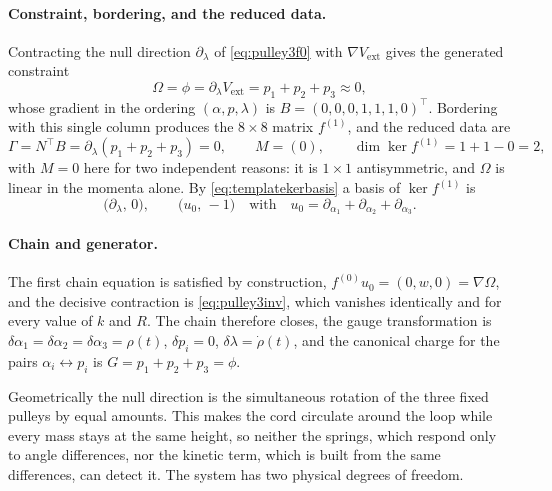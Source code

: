 \documentclass[12pt]{article}
\theoremstyle{plain}
\theoremstyle{definition}
\theoremstyle{remark}
\newcommand{\Om}{\Omega}
\begin{document}
	\paragraph{Constraint, bordering, and the reduced data.} Contracting the null
	direction $\partial_{\lambda}$ of \eqref{eq:pulley3f0} with
	$\nabla V_{\mathrm{ext}}$ gives the generated constraint
	\begin{equation}
		\Om=\phi=\partial_{\lambda}V_{\mathrm{ext}}=p_{1}+p_{2}+p_{3}\approx0,
		\label{eq:pulley3phi}
	\end{equation}
	whose gradient in the ordering $(\alpha,p,\lambda)$ is
	$B=(0,0,0,1,1,1,0)^{\top}$. Bordering with this single column produces the
	$8\times8$ matrix $f^{(1)}$, and the reduced data are
	\begin{equation}
		\Gamma=N^{\top}B=\partial_{\lambda}(p_{1}+p_{2}+p_{3})=0,
		\qquad
		M=(0),
		\qquad
		\dim\ker f^{(1)}=1+1-0=2,
		\label{eq:pulley3GM}
	\end{equation}
	with $M=0$ here for two independent reasons: it is $1\times1$ antisymmetric,
	and $\Om$ is linear in the momenta alone. By
	\eqref{eq:templatekerbasis} a basis of $\ker f^{(1)}$ is
	\begin{equation}
		\bigl(\partial_{\lambda},\,0\bigr),
		\qquad
		\bigl(u_{0},\,-1\bigr)
		\quad\text{with}\quad
		u_{0}=\partial_{\alpha_{1}}+\partial_{\alpha_{2}}+\partial_{\alpha_{3}} .
		\label{eq:pulley3ker1}
	\end{equation}
	
	\paragraph{Chain and generator.} The first chain equation is satisfied by
	construction, $f^{(0)}u_{0}=(0,w,0)=\nabla\Om$, and the decisive contraction is
	\eqref{eq:pulley3inv}, which vanishes identically and for every value of
	$k$ and $R$. The chain therefore closes, the gauge transformation is
	$\delta\alpha_{1}=\delta\alpha_{2}=\delta\alpha_{3}=\rho(t)$,
	$\delta p_{i}=0$, $\delta\lambda=\dot\rho(t)$, and the canonical charge for the
	pairs $\alpha_{i}\leftrightarrow p_{i}$ is $G=p_{1}+p_{2}+p_{3}=\phi$.
	
	Geometrically the null direction is the simultaneous rotation of the three fixed
	pulleys by equal amounts. This makes the cord circulate around the loop while
	every mass stays at the same height, so neither the springs, which respond only
	to angle differences, nor the kinetic term, which is built from the same
	differences, can detect it. The system has two physical degrees of freedom.
	
\end{document}
